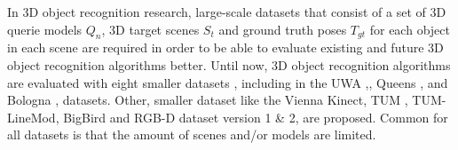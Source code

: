 \documentclass[10pt,twocolumn,letterpaper]{article}
\begin{document}
In 3D object recognition research, large-scale datasets that consist of a set of 3D querie models $Q_n$, 3D target scenes $S_t$ and ground truth poses $T_{gt}$ for each object in each scene are required in order to be able to evaluate existing and future 3D object recognition algorithms better. Until now, 3D object recognition algorithms are evaluated with eight smaller datasets \cite{Guo2015}, including in the UWA \cite{Mian2006},\cite{Mian2010}, Queens \cite{Taati2007},\cite{Taati2007} and Bologna \cite{Salti2014},\cite{Tombari2010} datasets. Other, smaller dataset like the Vienna Kinect\cite{Aldoma2012}, TUM \cite{Rodola2013}, TUM-LineMod\cite{Hinterstoisser2012}, BigBird\cite{BigBIRD} and RGB-D dataset version 1 \& 2\cite{Lai2011}, \cite{Lai2014} are proposed. Common for all datasets is that the amount of scenes and/or models are limited.\\
\end{document}
